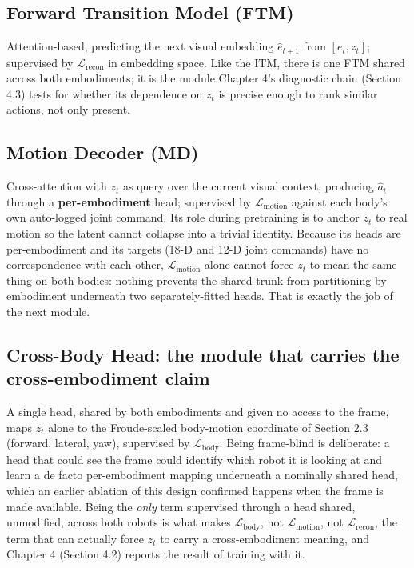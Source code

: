 \documentclass[12pt,a4paper,oneside]{report}
\begin{document}
\subsection{Forward Transition Model (FTM)}
Attention-based, predicting the next visual embedding $\hat{e}_{t+1}$ from $[e_t, z_t]$; supervised by
$\mathcal{L}_{\text{recon}}$ in embedding space. Like the ITM, there is one FTM shared across both embodiments; it
is the module Chapter 4's diagnostic chain (Section 4.3) tests for whether its dependence on $z_t$ is precise
enough to rank similar actions, not only present.

\subsection{Motion Decoder (MD)}
Cross-attention with $z_t$ as query over the current visual context, producing $\hat{a}_t$ through a
\textbf{per-embodiment} head; supervised by $\mathcal{L}_{\text{motion}}$ against each body's own auto-logged
joint command. Its role during pretraining is to anchor $z_t$ to real motion so the latent cannot collapse into a
trivial identity. Because its heads are per-embodiment and its targets (18-D and 12-D joint commands) have no
correspondence with each other, $\mathcal{L}_{\text{motion}}$ alone cannot force $z_t$ to mean the same thing on
both bodies: nothing prevents the shared trunk from partitioning by embodiment underneath two separately-fitted
heads. That is exactly the job of the next module.

\subsection{Cross-Body Head: the module that carries the cross-embodiment claim}
A single head, shared by both embodiments and given no access to the frame, maps $z_t$ alone to the Froude-scaled
body-motion coordinate of Section 2.3 (forward, lateral, yaw), supervised by $\mathcal{L}_{\text{body}}$. Being
frame-blind is deliberate: a head that could see the frame could identify which robot it is looking at and learn
a de facto per-embodiment mapping underneath a nominally shared head, which an earlier ablation of this design
confirmed happens when the frame is made available. Being the \emph{only} term supervised through a head shared,
unmodified, across both robots is what makes $\mathcal{L}_{\text{body}}$, not $\mathcal{L}_{\text{motion}}$, not
$\mathcal{L}_{\text{recon}}$, the term that can actually force $z_t$ to carry a cross-embodiment meaning, and
Chapter 4 (Section 4.2) reports the result of training with it.
\end{document}
